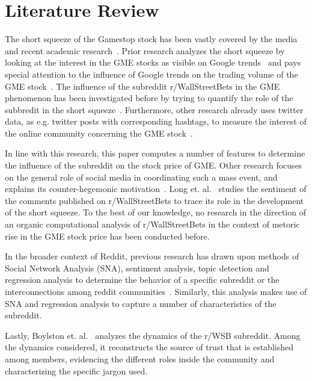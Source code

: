 \documentclass[noacm,sigconf,authorversion]{acmart}
\begin{document}
\section{Literature Review}
The short squeeze of the Gamestop stock has been vastly covered by the media and recent academic research~\cite{chohan2021counter, intradaygamestop, long2021just, burnette2021were, lyocsa2021yolo, umar2021tale}. Prior research analyzes the short squeeze by looking at the interest in the GME stocks as visible on Google trends~\cite{intradaygamestop, lyocsa2021yolo} and pays special attention to the influence of Google trends on the trading volume of the GME stock~\cite{intradaygamestop}. The influence of the subreddit r/WallStreetBets in the GME phenomenon has  been  investigated before by trying to quantify the role of the subbredit in the short squeeze~\cite{lyocsa2021yolo}. Furthermore, other research already uses twitter data, as e.g. twitter posts with corresponding hashtags,  to measure the interest of the online community concerning the GME stock~\cite{umar2021tale}. \par
 In line with this research, this paper computes a number of features to determine the influence of the subreddit on the stock price of GME. Other research focuses on the general role of social media in coordinating such a mass event, and explains its counter-hegemonic motivation~\cite{chohan2021counter, burnette2021were}. Long et. al.~\citep{long2021just} studies the sentiment of the comments published on r/WallStreetBets to trace its role in the development of the short squeeze. To the best of our knowledge, no research in the direction of an organic computational analysis of r/WallStreetBets in the context of metoric rise in the GME stock price has been conducted before.\par 

In the broader context of Reddit, previous research has drawn upon methods of Social Network Analysis (SNA), sentiment analysis, topic detection and regression analysis to determine the behavior of a specific subreddit or the interconnections among reddit communities~\cite{cai_characterizing, moessner2018analyzing}. Similarly, this analysis makes use of SNA and regression analysis to capture a number of characteristics of the subreddit. \par

Lastly, Boylston et. al.~\citep{boylston2021wallstreetbets} analyzes the dynamics of the r/WSB subreddit. Among the dynamics considered, it reconstructs the source of trust that is established among members, evidencing the different roles inside the community and characterizing the specific jargon used. 
\end{document}
